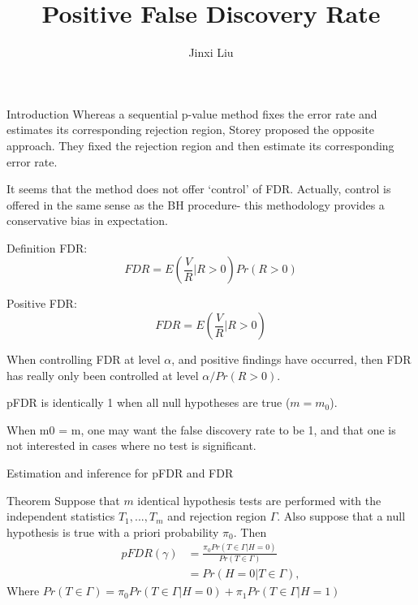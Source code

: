 \documentclass{beamer}
\title{Positive False Discovery Rate}
\author{Jinxi Liu}
\begin{document}
	
\begin{frame}
	
	\titlepage
	
\end{frame}


\begin{frame}[t]{Introduction}\vspace{10pt}
Whereas a sequential p-value method fixes the error rate and estimates its corresponding rejection region, Storey proposed the opposite approach. They fixed the rejection region and then estimate its corresponding error rate. 

It seems that the method does not offer ‘control’ of FDR. Actually, control is offered in the same sense as the BH procedure- this methodology provides a conservative bias in expectation.

\end{frame}

\begin{frame}[t]{Definition}\vspace{10pt}
FDR:
$$ FDR = E\left(\frac{V}{R}|R > 0 \right)Pr(R>0) $$


Positive FDR:
$$ FDR = E\left(\frac{V}{R}|R > 0 \right) $$

When controlling FDR at level $\alpha$, and positive findings have
occurred, then FDR has really only been controlled at level $\alpha/Pr(R>0)$. 

pFDR is identically 1 when all null hypotheses are true ($m=m_0$). 

When m0 = m, one may want the false discovery rate to be 1, and that one is not interested in cases where no test is significant.
\end{frame}

\begin{frame}[t]{Estimation and inference for pFDR and FDR}\vspace{10pt}
\begin{block}{Theorem} 
Suppose that $m$ identical hypothesis tests are performed with the independent statistics $T_1,...,T_m$ and rejection region $\Gamma$. Also suppose that a null hypothesis is true with a priori probability $π_0$. Then
\begin{align*}
pFDR(\gamma) &= \frac{\pi_0Pr(T\in\Gamma|H=0)}{Pr(T\in\Gamma)} \\
             &= Pr(H=0|T \in\Gamma),
\end{align*}
Where $Pr(T \in\Gamma) = \pi_0Pr(T\in\Gamma|H=0) + \pi_1Pr(T\in\Gamma|H=1)$
\end{block}
\end{frame}
\end{document}
